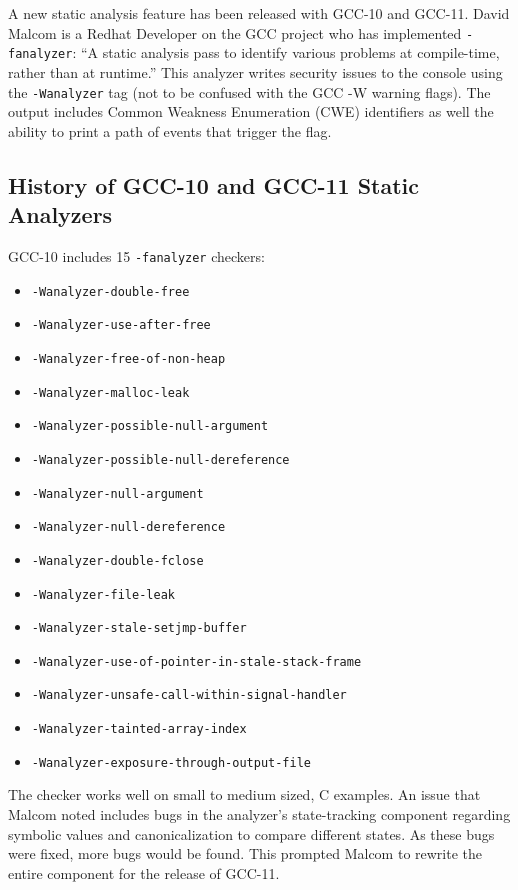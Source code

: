 A new static analysis feature has been released with GCC-10 and GCC-11. David Malcom is a Redhat Developer on the GCC project who has implemented \texttt{-fanalyzer}: ``A static analysis pass to identify various problems at compile-time, rather than at runtime.''\autocite{20211220:gcc10} This analyzer writes security issues to the console using the \texttt{-Wanalyzer} tag (not to be confused with the GCC -W warning flags). The output includes Common Weakness Enumeration (CWE) identifiers as well the ability to print a path of events that trigger the flag.

\subsection{History of GCC-10 and GCC-11 Static Analyzers}

GCC-10 includes 15 \texttt{-fanalyzer} checkers:
\begin{itemize}
	\item \texttt{-Wanalyzer-double-free}
	\item \texttt{-Wanalyzer-use-after-free}
	\item \texttt{-Wanalyzer-free-of-non-heap}
	\item \texttt{-Wanalyzer-malloc-leak}
	\item \texttt{-Wanalyzer-possible-null-argument}
	\item \texttt{-Wanalyzer-possible-null-dereference}
	\item \texttt{-Wanalyzer-null-argument}
	\item \texttt{-Wanalyzer-null-dereference}
	\item \texttt{-Wanalyzer-double-fclose}
	\item \texttt{-Wanalyzer-file-leak}
	\item \texttt{-Wanalyzer-stale-setjmp-buffer}
	\item \texttt{-Wanalyzer-use-of-pointer-in-stale-stack-frame}
	\item \texttt{-Wanalyzer-unsafe-call-within-signal-handler}
	\item \texttt{-Wanalyzer-tainted-array-index}
	\item \texttt{-Wanalyzer-exposure-through-output-file}
\end{itemize}

The checker works well on small to medium sized, C examples. An issue that Malcom noted includes bugs in the analyzer's state-tracking component regarding symbolic values and canonicalization to compare different states. As these bugs were fixed, more bugs would be found. This prompted Malcom to rewrite the entire component for the release of GCC-11.

